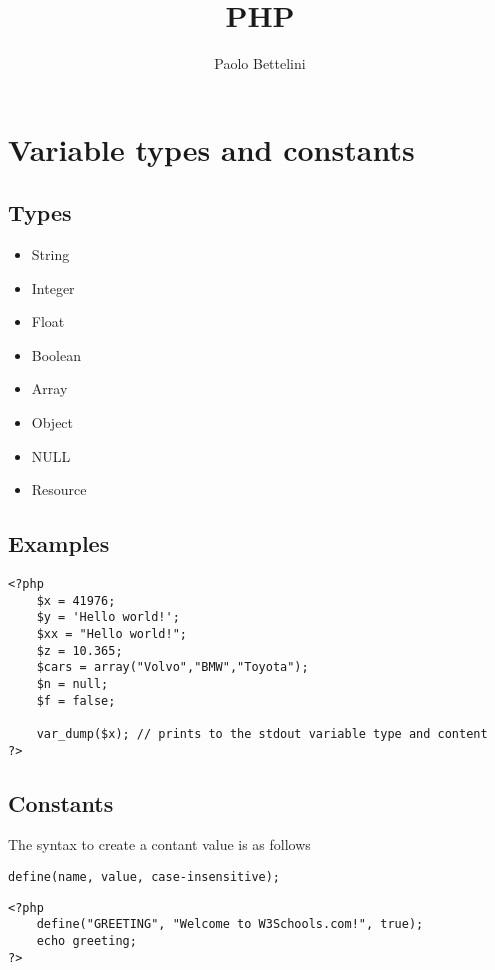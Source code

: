 \documentclass[a4paper]{article}
\title{PHP}
\author{Paolo Bettelini}
\date{}
\begin{document}
\maketitle
\tableofcontents
\pagebreak

\section{Variable types and constants}

\subsection{Types}

\begin{itemize}
    \item String
    \item Integer
    \item Float
    \item Boolean
    \item Array
    \item Object
    \item NULL
    \item Resource
\end{itemize}

\subsection{Examples}

\begin{lstlisting}
<?php
    $x = 41976;
    $y = 'Hello world!';
    $xx = "Hello world!";
    $z = 10.365;
    $cars = array("Volvo","BMW","Toyota");
    $n = null;
    $f = false;
    
    var_dump($x); // prints to the stdout variable type and content
?>
\end{lstlisting}

\subsection{Constants}

The syntax to create a contant value is as follows

\begin{lstlisting}
define(name, value, case-insensitive);
\end{lstlisting}

\begin{lstlisting}
<?php
    define("GREETING", "Welcome to W3Schools.com!", true);
    echo greeting;
?>
\end{lstlisting}
\end{document}
